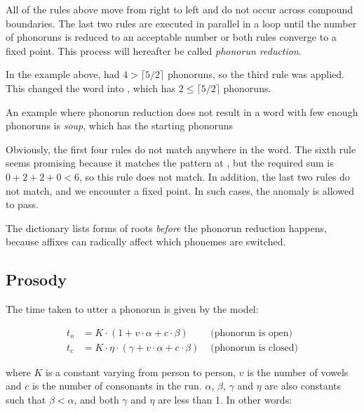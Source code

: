\documentclass{book}
\begin{document}
All of the rules above move from right to left and do not occur across compound boundaries. The last two rules are executed in parallel in a loop until the number of phonoruns is reduced to an acceptable number or both rules converge to a fixed point. This process will hereafter be called \emph{phonorun reduction}.

In the example above,  had $4 > \lceil 5 / 2 \rceil$ phonoruns, so the third rule was applied. This changed the word into , which has $2 \le \lceil 5 / 2 \rceil$ phonoruns.

An example where phonorun reduction does not result in a word with few enough phonoruns is  \emph{soup}, which has the starting phonoruns

\begin{center}
\end{center}

Obviously, the first four rules do not match anywhere in the word. The sixth rule seems promising because it matches the pattern at , but the required sum is $0 + 2 + 2 + 0 < 6$, so this rule does not match. In addition, the last two rules do not match, and we encounter a fixed point. In such cases, the anomaly is allowed to pass.

The dictionary lists forms of roots \emph{before} the phonorun reduction happens, because affixes can radically affect which phonemes are switched.

\subsection{Prosody}

The time taken to utter a phonorun is given by the model:

\begin{align}
  t_o &= K \cdot (1 + v \cdot \alpha + c \cdot \beta) & \text{ (phonorun is open)} \\
  t_c &= K \cdot \eta \cdot (\gamma + v \cdot \alpha + c \cdot \beta) & \text{ (phonorun is closed)}
\end{align}

where $K$ is a constant varying from person to person, $v$ is the number of vowels and $c$ is the number of consonants in the run. $\alpha$, $\beta$, $\gamma$ and $\eta$ are also constants such that $\beta < \alpha$, and both $\gamma$ and $\eta$ are less than 1. In other words:
\end{document}
